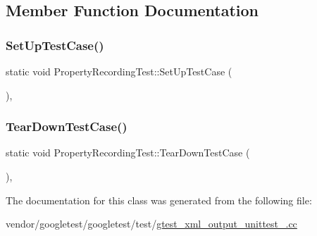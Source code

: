 \subsection{Member Function Documentation}
\mbox{\label{class_property_recording_test_a673c9dfcd9f0c8d10d0df765852c1669}} 
\subsubsection{\texorpdfstring{Set\+Up\+Test\+Case()}{SetUpTestCase()}}
{\footnotesize\ttfamily static void Property\+Recording\+Test\+::\+Set\+Up\+Test\+Case (\begin{DoxyParamCaption}{ }\end{DoxyParamCaption})\hspace{0.3cm}{\ttfamily [inline]}, {\ttfamily [static]}}

\mbox{\label{class_property_recording_test_ac0d2d47efbdc4399777dffca6071d15d}} 
\subsubsection{\texorpdfstring{Tear\+Down\+Test\+Case()}{TearDownTestCase()}}
{\footnotesize\ttfamily static void Property\+Recording\+Test\+::\+Tear\+Down\+Test\+Case (\begin{DoxyParamCaption}{ }\end{DoxyParamCaption})\hspace{0.3cm}{\ttfamily [inline]}, {\ttfamily [static]}}



The documentation for this class was generated from the following file\+:\begin{DoxyCompactItemize}
\item 
vendor/googletest/googletest/test/\hyperlink{gtest__xml__output__unittest___8cc}{gtest\+\_\+xml\+\_\+output\+\_\+unittest\+\_\+.\+cc}\end{DoxyCompactItemize}
